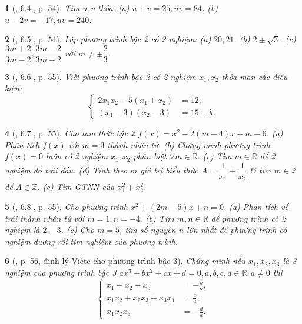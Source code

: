 \documentclass{article}
\newtheorem{baitoan}{}
\begin{document}
\begin{baitoan}[\cite{Binh_boi_duong_Toan_9_tap_2}, 6.4., p. 54]
	Tìm $u,v$ thỏa: (a) $u + v = 25,uv = 84$. (b) $u - 2v = -17,uv = 240$.
\end{baitoan}

\begin{baitoan}[\cite{Binh_boi_duong_Toan_9_tap_2}, 6.5., p. 54]
	Lập phương trình bậc 2 có 2 nghiệm: (a) $20,21$. (b) $2\pm\sqrt{3}$. (c) $\dfrac{3m + 2}{3m - 2},\dfrac{3m - 2}{3m + 2}$ với $m\ne\pm\dfrac{2}{3}$.
\end{baitoan}

\begin{baitoan}[\cite{Binh_boi_duong_Toan_9_tap_2}, 6.6., p. 55]
	Viết phương trình bậc 2 có 2 nghiệm $x_1,x_2$ thỏa mãn các điều kiện:
	\begin{equation*}
		\left\{\begin{split}
			2x_1x_2 - 5(x_1 + x_2) &= 12,\\
			(x_1 - 3)(x_2 - 3) &= 15 - k.
		\end{split}\right.
	\end{equation*}
\end{baitoan}

\begin{baitoan}[\cite{Binh_boi_duong_Toan_9_tap_2}, 6.7., p. 55]
	Cho tam thức bậc 2 $f(x) = x^2 - 2(m - 4)x + m - 6$. (a) Phân tích $f(x)$ với $m = 3$ thành nhân tử. (b) Chứng minh phương trình $f(x) = 0$ luôn có 2 nghiệm $x_1,x_2$ phân biệt $\forall m\in\mathbb{R}$. (c) Tìm $m\in\mathbb{R}$ để 2 nghiệm đó trái dấu. (d) Tính theo $m$ giá trị biểu thức $A = \dfrac{1}{x_1} + \dfrac{1}{x_2}$ \& tìm $m\in\mathbb{Z}$ để $A\in\mathbb{Z}$. (e) Tìm {\rm GTNN} của $x_1^2 + x_2^2$.
\end{baitoan}

\begin{baitoan}[\cite{Binh_boi_duong_Toan_9_tap_2}, 6.8., p. 55]
	Cho phương trình $x^2 + (2m - 5)x + n = 0$. (a) Phân tích vế trái thành nhân tử với $m = 1,n = -4$. (b) Tìm $m,n\in\mathbb{R}$ để phương trình có 2 nghiệm là $2,-3$. (c) Cho $m = 5$, tìm số nguyên $n$ lớn nhất để phương trình có nghiệm dương rồi tìm nghiệm của phương trình.
\end{baitoan}

\begin{baitoan}[\cite{Binh_boi_duong_Toan_9_tap_2}, p. 56, định lý Vi\`ete cho phương trình bậc 3]
	Chứng minh nếu $x_1,x_2,x_3$ là 3 nghiệm của phương trình bậc 3 $ax^3 + bx^2 + cx + d = 0,a,b,c,d\in\mathbb{R},a\ne0$ thì
	\begin{equation*}
		\left\{\begin{split}
			x_1 + x_2 + x_3 &= -\frac{b}{a},\\
			x_1x_2 + x_2x_3 + x_3x_1 &= \frac{c}{a},\\
			x_1x_2x_3 &= -\frac{d}{a}.
		\end{split}\right.
	\end{equation*}
\end{baitoan}
\end{document}
